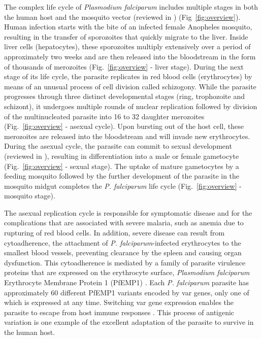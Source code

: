 The complex life cycle of \textit{Plasmodium falciparum} includes multiple stages in
both the human host and the mosquito vector (reviewed in
\citet{greenwood:malaria}) (Fig~\ref{fig:overview}). Human
infection starts with the bite of an infected female Anopheles mosquito,
resulting in the transfer of sporozoites that quickly migrate to the liver.
Inside liver cells (hepatocytes), these sporozoites multiply extensively over
a period of approximately two weeks and are then released into the bloodstream
in the form of thousands of merozoites (Fig.~\ref{fig:overview} - liver stage).
During the next
stage of its life cycle, the parasite replicates in red blood cells
(erythrocytes) by means of an unusual process of cell division called
schizogony. While the parasite progresses through three distinct developmental
stages (ring, trophozoite and schizont), it undergoes multiple rounds of
nuclear replication followed by division of the multinucleated parasite into
16 to 32 daughter merozoites (Fig.~\ref{fig:overview} - asexual cycle).
Upon bursting out of
the host cell, these merozoites are released into the bloodstream and will
invade new erythrocytes. During the asexual cycle, the parasite can commit to
sexual development (reviewed in \citet{baker:malaria}),
resulting in differentiation into a male
or female gametocyte (Fig.~\ref{fig:overview} - sexual stage). The uptake of mature gametocytes
by a feeding mosquito followed by the further development of the parasite in
the mosquito midgut completes the \textit{P. falciparum} life cycle
(Fig.~\ref{fig:overview} - mosquito
stage).

The asexual replication cycle is responsible for symptomatic disease and for
the complications that are associated with severe malaria, such as anemia due
to rupturing of red blood cells. In addition, severe disease can result from
cytoadherence, the attachment of \textit{P. falciparum}-infected erythrocytes to the
smallest blood vessels, preventing clearance by the spleen and causing organ
dysfunction. This cytoadherence is mediated by a family of parasite virulence
proteins that are expressed on the erythrocyte surface, \textit{Plasmodium
falciparum}
Erythrocyte Membrane Protein 1 (PfEMP1) \citep{baruch:cloning, smith:switches,
su:large}. Each \textit{P. falciparum} parasite has
approximately 60 different PfEMP1 variants encoded by var genes, only one of
which is expressed at any time. Switching var gene expression enables the
parasite to escape from host immune responses \citep{bull:parasite,
roberts:rapid}. This process of antigenic
variation is one example of the excellent adaptation of the parasite to
survive in the human host.

